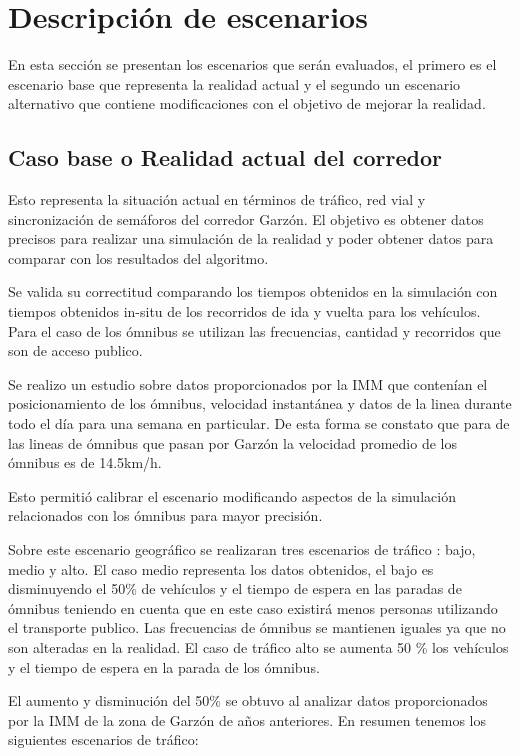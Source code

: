 \section{Descripción de escenarios}
En esta sección se presentan los escenarios que serán evaluados, el primero es el escenario base que representa la realidad actual y el segundo un escenario alternativo que contiene modificaciones con el objetivo de mejorar la realidad.

\subsection{Caso base o Realidad actual del corredor}
Esto representa la situación actual en términos de tráfico, red vial y sincronización de semáforos del corredor Garzón. El objetivo es obtener datos precisos para realizar una simulación de la realidad y poder obtener datos para comparar con los resultados del algoritmo. 

Se valida su correctitud comparando los tiempos obtenidos en la simulación con tiempos obtenidos in-situ de los recorridos de ida y vuelta para los vehículos. Para el caso de los ómnibus se utilizan las frecuencias, cantidad y recorridos que son de acceso publico.

Se realizo un estudio sobre datos proporcionados por la IMM que contenían el posicionamiento de los ómnibus, velocidad instantánea y datos de la linea durante todo el día para una semana en particular. De esta forma se constato que para de las lineas de ómnibus que pasan por Garzón la  velocidad promedio de los ómnibus es de 14.5km/h.

Esto permitió calibrar el escenario modificando aspectos de la simulación relacionados con los ómnibus para mayor precisión.

Sobre este escenario geográfico se realizaran tres escenarios de tráfico : bajo, medio y alto.
El caso medio representa los datos obtenidos, el bajo es disminuyendo el 50\% de vehículos y  el tiempo de espera en las paradas de ómnibus teniendo en cuenta que en este caso existirá menos personas utilizando el transporte publico. Las frecuencias de ómnibus se mantienen iguales ya que no son alteradas en la realidad.
El caso de tráfico alto se aumenta 50 \%  los vehículos y el tiempo de espera en la parada de los ómnibus.

El aumento y disminución del 50\% se obtuvo al analizar datos proporcionados por la IMM de la zona de Garzón de años anteriores. \newline
En resumen tenemos los siguientes escenarios de tráfico:


